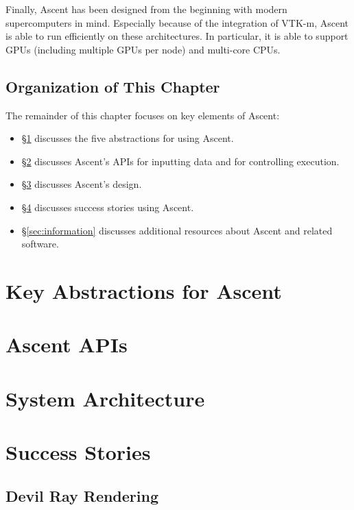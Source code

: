 \documentclass[graybox]{svmult}
\begin{document}
Finally, Ascent has been designed from the beginning with modern
supercomputers in mind.
%
Especially because of the integration of VTK-m, Ascent is able to
run efficiently on these architectures.
%
In particular, it is able to support GPUs (including multiple GPUs per node) 
and multi-core CPUs.

\subsection{Organization of This Chapter}

The remainder of this chapter focuses on key elements of Ascent:
\begin{itemize}
\item \S\ref{sec:capabilities} discusses the five abstractions for using Ascent.
\item \S\ref{sec:API} discusses Ascent's APIs for inputting
data and for controlling execution.
\item \S\ref{sec:design} discusses Ascent's design.
\item \S\ref{sec:success} discusses success stories using Ascent.
\item \S\ref{sec:information} discusses additional resources about Ascent and related software. 
\end{itemize}


\section{Key Abstractions for Ascent}
\label{sec:capabilities}


\section{Ascent APIs}
\label{sec:API}


\section{System Architecture}
\label{sec:design}


\section{Success Stories}
\label{sec:success}


\subsection{Devil Ray Rendering}
\label{sec:DevilRay}

\end{document}
